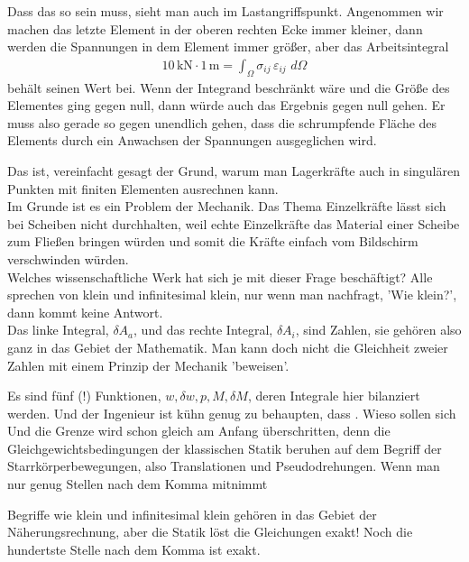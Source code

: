 {Dass das so sein muss, sieht man auch im Lastangriffspunkt. Angenommen wir machen das letzte Element in der oberen rechten Ecke immer kleiner, dann werden die Spannungen in dem Element immer gr\"{o}{\ss}er, aber das Arbeitsintegral
\begin{align}
10\,\text{kN} \cdot 1\,\text{m} = \int_{\Omega} \sigma_{ij}\, \varepsilon_{ij}\,\,d\Omega
\end{align}
beh\"{a}lt seinen Wert bei. Wenn der Integrand beschr\"{a}nkt w\"{a}re und die Gr\"{o}{\ss}e des Elementes ging gegen null, dann w\"{u}rde auch das Ergebnis gegen null gehen. Er muss also gerade so gegen unendlich gehen, dass die schrumpfende Fl\"{a}che des Elements durch ein Anwachsen der Spannungen ausgeglichen wird.

Das ist, vereinfacht gesagt der Grund, warum man Lagerkr\"{a}fte auch in singul\"{a}ren Punkten mit finiten Elementen ausrechnen kann.\\

Im Grunde ist es ein Problem der Mechanik. Das Thema Einzelkr\"{a}fte l\"{a}sst sich bei Scheiben nicht durchhalten, weil echte Einzelkr\"{a}fte das Material einer Scheibe zum Flie{\ss}en bringen w\"{u}rden und somit die Kr\"{a}fte einfach vom Bildschirm verschwinden w\"{u}rden.\\

Welches wissenschaftliche Werk hat sich je mit dieser Frage besch\"{a}ftigt? Alle sprechen von klein und infinitesimal klein, nur wenn man nachfragt, 'Wie klein?', dann kommt keine Antwort.\\


Das linke Integral, $\delta A_a$, und das rechte Integral, $\delta A_i$, sind Zahlen, sie geh\"{o}ren also ganz in das Gebiet der Mathematik. Man kann doch nicht die Gleichheit zweier Zahlen mit einem Prinzip der Mechanik 'beweisen'.

Es sind f\"{u}nf (!) Funktionen, $w, \delta w, p, M, \delta M$, deren Integrale hier bilanziert werden. Und der Ingenieur ist k\"{u}hn genug zu behaupten, dass . Wieso sollen sich
\\

Und die Grenze wird schon gleich am Anfang \"{u}berschritten, denn die Gleichgewichtsbedingungen der klassischen Statik beruhen auf dem Begriff der Starrk\"{o}rperbewegungen, also Translationen und Pseudodrehungen.
Wenn man nur genug Stellen nach dem Komma mitnimmt

Begriffe wie klein und infinitesimal klein geh\"{o}ren in das Gebiet der N\"{a}herungsrechnung, aber die Statik l\"{o}st die Gleichungen exakt! Noch die hundertste Stelle nach dem Komma ist exakt.
\\

}
